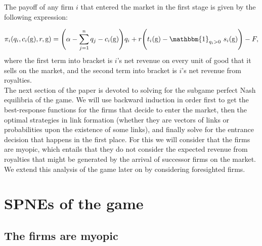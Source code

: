 \documentclass[11pt]{article}
\begin{document}
The payoff of any firm $i$ that entered the market in the first stage is given by the following expression: 

\begin{equation}
\pi_i(q_i, c_i(\text{g}), r, \text{g}) = \Bigg(\alpha - \sum_{j=1}^n q_j - c_i(\text{g})\Bigg)q_i + r\Bigg( t_i(\text{g}) - \mathbbm{1}_{q_i>0}~ s_i(\text{g})\Bigg)  - F \label{payoff},
\end{equation}  
where the first term into bracket is $i$'s net revenue on every unit of good that it sells on the market, and the second term into bracket is $i$'s net revenue from royalties. \\

\indent The next section of the paper is devoted to solving for the subgame perfect Nash equilibria of the game. We will use backward induction in order first to get the best-response functions for the firms that decide to enter the market, then the optimal strategies in link formation (whether they are vectors of links or probabilities upon the existence of some links), and finally solve for the entrance decision that happens in the first place. For this we will consider that the firms are myopic, which entails that they do not consider the expected revenue from royalties that might be generated by the arrival of successor firms on the market. We extend this analysis of the game later on by considering foresighted firms. 

\section{SPNEs of the game }
\subsection{The firms are myopic}
\end{document}
